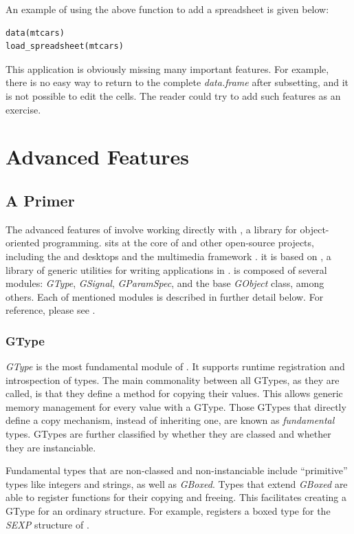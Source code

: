 \documentclass[article]{jss}
\begin{document}
An example of using the above function to add a spreadsheet is given below:
\begin{verbatim}
data(mtcars)
load_spreadsheet(mtcars)
\end{verbatim}
This application is obviously missing many important features. For example, 
there is no easy way to return to the complete \emph{data.frame} after subsetting, and
it is not possible to edit the cells. The reader could try to add such features
as an exercise.

\section{Advanced Features}

\subsection[A GObject Primer]{A  Primer}\label{sec:primer}

The advanced features of  involve working directly with
, a  library for object-oriented programming. 
 sits at the core of  and other 
open-source projects, including the  \citep{GTK} and  
\citep{xfce} desktops and the  multimedia framework \citep{gstreamer}.
it is based on , a library of generic utilities for
writing applications in .
 is composed of several modules: \emph{GType},
\emph{GSignal}, \emph{GParamSpec}, and the base \emph{GObject} 
class, among others. Each of mentioned modules is described in further detail 
below. For reference, please see \citep{gobject}.

\subsubsection{GType}

\emph{GType} is the most fundamental module of . It supports runtime 
registration and introspection of types. The
main commonality between all GTypes, as they are called, is that they define
a method for copying their values. This allows generic memory management for
every value with a GType. Those GTypes that directly define a copy mechanism,
instead of inheriting one, are known as \emph{fundamental} types.
GTypes are further classified by whether they are classed and whether they are
instanciable. 

Fundamental types that are non-classed and non-instanciable 
include ``primitive'' types like integers and strings, as well as \emph{GBoxed}.
Types that extend \emph{GBoxed} are able to register functions for their
copying and freeing. This facilitates creating a GType for an ordinary 
 structure. For example,  registers a boxed type for 
the \emph{SEXP} structure of . 
\end{document}
